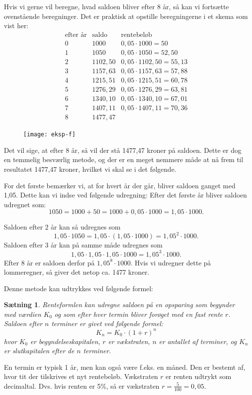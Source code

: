 \documentclass[12pt,oneside,a4paper]{article}
\theoremstyle{plain}
\newtheorem*{thm}{Sætning}
\begin{document}
Hvis vi gerne vil beregne, hvad saldoen bliver efter 8 år, så kan vi fortsætte
ovenstående beregninger. Det er praktisk at opstille beregningerne i et skema
som vist her:
$$
\begin{array}{r|c|l}
    \mbox{efter år} & \mbox{saldo} & \mbox{rentebeløb} \\
    \hline
0 & 1000 & 0,05\cdot 1000 = 50 \\
    \hline
1 & 1050 & 0,05\cdot 1050 = 52,50 \\
    \hline
2 & 1102,50 & 0,05\cdot 1102,50 = 55,13 \\
    \hline
3 & 1157,63 & 0,05\cdot 1157,63 = 57,88 \\
    \hline
4 & 1215,51 & 0,05\cdot 1215,51 = 60,78 \\
    \hline
5 & 1276,29 & 0,05\cdot 1276,29 = 63,81 \\
    \hline
6 & 1340,10 & 0,05\cdot 1340,10 = 67,01 \\
    \hline
7 & 1407,11 & 0,05\cdot 1407,11 = 70,36 \\
    \hline
8 & 1477,47 & 
\end{array}
$$
\begin{figure}[ht]
    \centering
    \texttt{[image: eksp-f]}
    \label{eksp-f}
\end{figure}
Det vil sige, at efter 8 år, så vil der stå 1477,47 kroner på saldoen.  Dette
er dog en temmelig besværlig metode, og der er en meget nemmere måde at nå frem
til resultatet 1477,47 kroner, hvilket vi skal se i det følgende.

For det første bemærker vi, at for hvert år der går, bliver saldoen ganget med
1,05. Dette kan vi indse ved følgende udregning: Efter det første år bliver
saldoen udregnet som:
$$
1050 = 1000 + 50 = 1000 + 0,05\cdot 1000 = 1,05 \cdot 1000.
$$

Saldoen efter 2 år kan så udregnes som
$$
1,05\cdot 1050 = 1,05 \cdot (1,05 \cdot 1000) = 1,05^2 \cdot 1000.
$$
Saldoen efter 3 år kan på samme måde udregnes som
$$
1,05\cdot1,05\cdot1,05\cdot 1000 = 1,05^3 \cdot 1000.
$$
Efter 8 år er saldoen
derfor på $1,05^8\cdot 1000$. Hvis vi udregner dette på lommeregner, så giver
det netop ca. 1477 kroner.

Denne metode kan udtrykkes ved følgende formel:
\begin{thm}
    {\em Renteformlen} kan udregne saldoen på en opsparing som begynder med
    værdien $K_0$ og som efter hver {\em termin} bliver forøget med en fast
    rente $r$. Saldoen efter $n$ terminer er givet ved følgende formel:
    $$
    K_n = K_0 \cdot (1+r)^n
    $$
    hvor $K_0$ er {\em begyndelseskapitalen}, $r$ er {\em vækstraten}, $n$ er antallet af
    terminer, og $K_n$ er {\em slutkapitalen} efter de $n$ terminer.
\end{thm}
En termin er typisk 1 år, men kan også være f.eks. en måned. Den er bestemt af,
hvor tit der tilskrives et nyt rentebeløb. Vækstraten $r$ er renten udtrykt som
decimaltal. Dvs. hvis renten er 5\%, så er vækstraten $r=\frac{5}{100}=0,05$.
\end{document}
